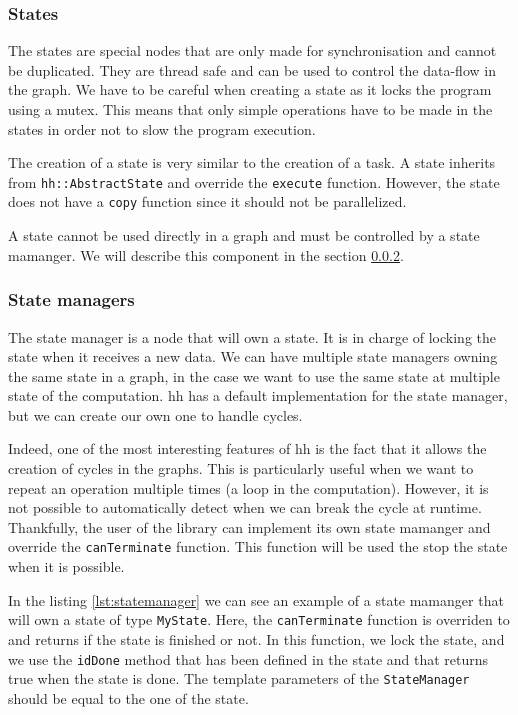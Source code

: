 \subsubsection{States}

The states are special nodes that are only made for synchronisation and cannot
be duplicated. They are thread safe and can be used to control the data-flow in
the graph. We have to be careful when creating a state as it locks the program
using a mutex. This means that only simple operations have to be made in the
states in order not to slow the program execution.

The creation of a state is very similar to the creation of a task. A state
inherits from \texttt{hh::AbstractState} and override the \texttt{execute}
function. However, the state does not have a \texttt{copy} function since it
should not be parallelized.

A state cannot be used directly in a graph and must be controlled by a state
mamanger. We will describe this component in the section \ref{sec:statemanager}.

\subsubsection{State managers}
\label{sec:statemanager}

The state manager is a node that will own a state. It is in charge of locking
the state when it receives a new data. We can have multiple state managers
owning the same state in a graph, in the case we want to use the same state at
multiple state of the computation. \gls{hh} has a default implementation for the
state manager, but we can create our own one to handle cycles.

Indeed, one of the most interesting features of \gls{hh} is the fact that it
allows the creation of cycles in the graphs. This is particularly useful when we
want to repeat an operation multiple times (a loop in the computation). However,
it is not possible to automatically detect when we can break the cycle at
runtime. Thankfully, the user of the library can implement its own state
mamanger and override the \texttt{canTerminate} function. This function will be
used the stop the state when it is possible.

In the listing \ref{lst:statemanager} we can see an example of a state mamanger
that will own a state of type \texttt{MyState}. Here, the \texttt{canTerminate}
function is overriden to and returns if the state is finished or not. In this
function, we lock the state, and we use the \texttt{idDone} method that has been
defined in the state and that returns true when the state is done. The template
parameters of the \texttt{StateManager} should be equal to the one of the
state.

